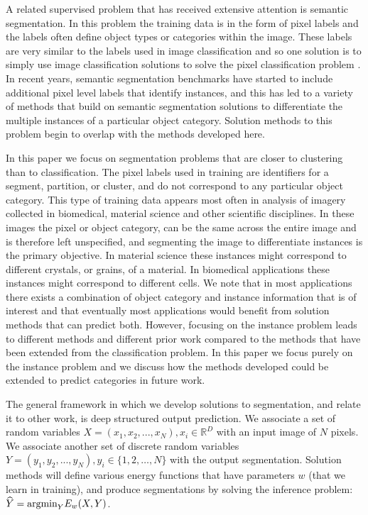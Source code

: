 \documentclass[letterpaper,twocolumn,fleqn]{article}
\begin{document}
A related supervised problem that has received extensive attention is semantic segmentation. In this problem the training data is in the form of pixel labels and the labels often define object types or categories within the image. These labels are very similar to the labels used in image classification and so one solution is to simply use image classification solutions to solve the pixel classification problem \cite{Long2015}. In recent years, semantic segmentation benchmarks have started to include additional pixel level labels that identify instances, and this has led to a variety of methods that build on semantic segmentation solutions to differentiate the multiple instances of a particular object category. Solution methods to this problem begin to overlap with the methods developed here. 

In this paper we focus on segmentation problems that are closer to clustering than to classification. The pixel labels used in training are identifiers for a segment, partition, or cluster, and do not correspond to any particular object category. This type of training data appears most often in analysis of imagery collected in biomedical, material science and other scientific disciplines. In these images the pixel or object category, can be the same across the entire image and is therefore left unspecified, and segmenting the image to differentiate instances is the primary objective. In material science these instances might correspond to different crystals, or grains, of a material. In biomedical applications these instances might correspond to different cells. We note that in most applications there exists a combination of object category and instance information that is of interest and that eventually most applications would benefit from solution methods that can predict both. However, focusing on the instance problem leads to different methods and different prior work compared to the methods that have been extended from the classification problem. In this paper we focus purely on the instance problem and we discuss how the methods developed could be extended to predict categories in future work.

The general framework in which we develop solutions to segmentation, and relate it to other work, is deep structured output prediction. We associate a set of random variables $X=(x_1,x_2,...,x_N), x_i \in \mathbb{R}^D$ with an input image of $N$ pixels. We associate another set of discrete random variables $Y=(y_1,y_2,...,y_N),y_i \in \{1,2,\ldots,N\}$ with the output segmentation. Solution methods will define various energy functions that have parameters $w$ (that we learn in training), and produce segmentations by solving the inference problem: $\widehat{Y} =\hbox{argmin}_{Y}E_{w}(X,Y)$. 
\end{document}
